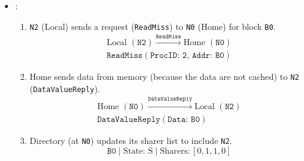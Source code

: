 \begin{itemize}
    \item {}:
    \begin{enumerate}
        \item \texttt{N2} (Local) sends a request (\texttt{ReadMiss}) to \texttt{N0} (Home) for block \texttt{B0}.
        \begin{gather*}
            \text{Local } (\texttt{N2}) \xrightarrow{\texttt{ReadMiss}} \text{Home } (\texttt{N0})
            \\[.3em]
            \texttt{ReadMiss}(\texttt{ProcID: 2, Addr: B0})
        \end{gather*}

        \item Home sends data from memory (because the data are not cached) to \texttt{N2} (\texttt{DataValueReply}).
        \begin{gather*}
            \text{Home } (\texttt{N0}) \xrightarrow{\texttt{DataValueReply}} \text{Local } (\texttt{N2})
            \\[.3em]
            \texttt{DataValueReply}(\texttt{Data: B0})
        \end{gather*}

        \item Directory (at \texttt{N0}) updates its sharer list to include \texttt{N2}.
        \begin{equation*}
            \texttt{B0} \; | \; \text{State: S} \; | \; \text{Sharers:} \, \left[0, 1, 1, 0\right]
        \end{equation*}
    \end{enumerate}

    \newpage

    \begin{figure}[!htp]
        \centering
\end{figure}
\end{itemize}
